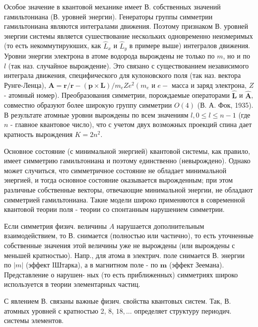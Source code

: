 \documentclass[10pt]{article}
\begin{document}
Особое значение в квантовой механике имеет В. собственных значений гамильтониана (В. уровней энергии). Генераторы группы симметрии гамильтониана являются интегралами движения. Поэтому признаком В. уровней энергии системы является сушествование нескольких одновременно неизмеримых (то есть некоммутируюших, как $\hat{L}_{x}$ и $\hat{L}_{y}$ в примере выше) интегралов движения. Уровни энергии электрона в атоме водорода вырождены не только по $m$, но и по $l$ (так наз. случайное вырождение). Это связано с существованием независимого интеграла движения, специфического для кулоновского поля (так наз. вектора Рунге-Ленца), $\boldsymbol{A}=\boldsymbol{r} / \boldsymbol{r}-(\boldsymbol{p} \times \boldsymbol{L}) / m_{e} Z e^{2}\left(m_{e}\right.$ и $e-$ масса и заряд электрона, $Z$ - атомный номер). Преобразования симметрии, порождаемые операторами $\hat{\boldsymbol{L}}$ и $\hat{\boldsymbol{A}}$, совместно образуют более широкую группу симметрии $O(4)$ (В. А. Фок, 1935). В результате атомные уровни вырождены по всем значениям $l, 0 \leqslant l \leqslant n-1$ (где $n$ - главное квантовое число), что с учетом двух возможных проекций спина дает кратность вырождения $K=2 n^{2}$.



Основное состояние (с минимальной энергией) квантовой системы, как правило, имеет симметрию гамильтониана и поэтому единственно (невырождено). Однако может случиться, что симметричное состояние не обладает минимальной энергией, и тогда основное состояние оказывается вырожденным; при этом различные собственные векторы, отвечающие минимальной энергии, не обладают симметрией гамильтониана. Такие модели широко применяются в современной квантовой теории поля - теории со спонтанным нарушением симметрии.



Если симметрия физич. величины $A$ нарушается дополнительным взаимодействием, то В. снимается (полностью или частично), то есть уточненные собственные значения этой величины уже не вырождены (или вырождены с меньшей кратностью). Напр., для атома в электрич. поле снимается В. энергии по $|m|$ (эффект IШтарка), а в магнитном поле - по $\boldsymbol{m}$ (эффект Зеемана). Представление о нарушен- ных (то есть приближенных) симметриях широко используется в теории элементарных частиц.



С явлением В. связаны важные физич. свойства квантовых систем. Так, В. атомных уровней с кратностью 2, 8, $18, \ldots$ определяет структуру периодич. системы элементов.
\end{document}
